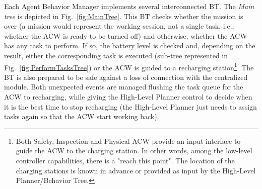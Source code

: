 Each Agent Behavior Manager implements several interconnected \gls{BT}. The \emph{Main tree} is depicted in Fig.~\ref{fig:MainTree}. This \gls{BT} checks whether the mission is over (a mission would represent the working session, not a single task, i.e., whether the \gls{ACW} is ready to be turned off) and otherwise, whether the \gls{ACW} has any task to perform. If so, the battery level is checked and, depending on the result, either the corresponding task is executed (sub-tree represented in Fig.~\ref{fig:PerformTasksTree}) or the \gls{ACW} is guided to a recharging station\footnote{Both Safety, Inspection and Physical-ACW provide an input interface to guide the \gls{ACW} to the charging station. In other words, among the low-level controller capabilities, there is a "reach this point". The location of the charging stations is known in advance or provided as input by the High-Level Planner/Behavior Tree.}. The \gls{BT} is also prepared to be safe against a loss of connection with the centralized module. Both unexpected events are managed flushing the task queue for the \gls{ACW} to recharging, while giving the High-Level Planner control to decide when it is the best time to stop recharging (the High-Level Planner just needs to assign tasks again so that the \gls{ACW} start working back).

